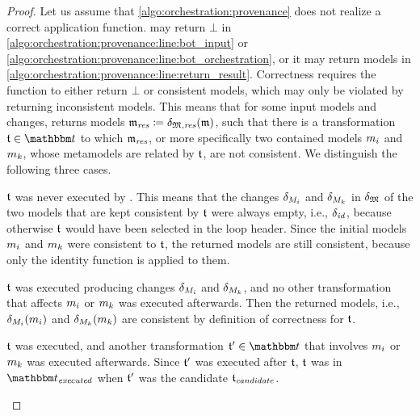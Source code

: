 \begin{proof}
    Let us assume that \autoref{algo:orchestration:provenance} does not realize a correct application function.
     may return $\bot$ in \autoref{algo:orchestration:provenance:line:bot_input} or \autoref{algo:orchestration:provenance:line:bot_orchestration}, or it may return models in \autoref{algo:orchestration:provenance:line:return_result}.
    Correctness requires the function to either return $\bot$ or consistent models, which may only be violated by  returning inconsistent models.
    This means that for some input models and changes,  returns models $\modeltuple{m}_\mathvariable{res} \equalsperdefinition \changetuple{\metamodeltuple{M},\mathvariable{res}}(\modeltuple{m})$, such that there is a transformation $\transformation{t} \in \transformationset{T}$ to which $\modeltuple{m}_\mathvariable{res}$, or more specifically two contained models $\model{m}{i}$ and $\model{m}{k}$, whose metamodels are related by $\transformation{t}$, are not consistent.
    We distinguish the following three cases.
    \begin{longenumerate}
        \item $\transformation{t}$ was never executed by . This means that the changes $\change{\metamodel{M}{i}}$ and $\change{\metamodel{M}{k}}$ in $\change{\metamodeltuple{M}}$ of the two models that are kept consistent by $\transformation{t}$ were always empty, i.e., $\delta_{\mathit{id}}$, because otherwise $\transformation{t}$ would have been selected in the loop header. Since the initial models $\model{m}{i}$ and $\model{m}{k}$ were consistent to $\transformation{t}$, the returned models are still consistent, because only the identity function is applied to them.
        \item $\transformation{t}$ was executed producing changes $\change{\metamodel{M}{i}}$ and $\change{\metamodel{M}{k}}$, and no other transformation that affects $\model{m}{i}$ or $\model{m}{k}$ was executed afterwards. Then the returned models, i.e., $\change{\metamodel{M}{i}}(\model{m}{i})$ and $\change{\metamodel{M}{k}}(\model{m}{k})$ are consistent by definition of correctness for $\transformation{t}$.
        \item $\transformation{t}$ was executed, and another transformation $\transformation{t}' \in \transformationset{T}$ that involves $\model{m}{i}$ or $\model{m}{k}$ was executed afterwards.
        Since $\transformation{t}'$ was executed after $\transformation{t}$, $\transformation{t}$ was in $\provalgexecuted$ when $\transformation{t}'$ was the candidate $\provalgcandidate$.

\end{longenumerate}
\end{proof}
